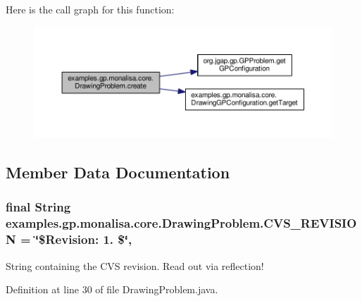 Here is the call graph for this function\-:
\nopagebreak
\begin{figure}[H]
\begin{center}
\leavevmode
\includegraphics[width=350pt]{classexamples_1_1gp_1_1monalisa_1_1core_1_1_drawing_problem_a5c391c027376cc876de2672312b7cfa0_cgraph}
\end{center}
\end{figure}




\subsection{Member Data Documentation}
\hypertarget{classexamples_1_1gp_1_1monalisa_1_1core_1_1_drawing_problem_a99ad1787f05be2ea069f05b7a4353b07}{
\subsubsection[{C\-V\-S\-\_\-\-R\-E\-V\-I\-S\-I\-O\-N}]{\setlength{\rightskip}{0pt plus 5cm}final String examples.\-gp.\-monalisa.\-core.\-Drawing\-Problem.\-C\-V\-S\-\_\-\-R\-E\-V\-I\-S\-I\-O\-N = \char`\"{}\$Revision\-: 1. \$\char`\"{}\hspace{0.3cm}{\ttfamily [static]}, {\ttfamily [private]}}}\label{classexamples_1_1gp_1_1monalisa_1_1core_1_1_drawing_problem_a99ad1787f05be2ea069f05b7a4353b07}
String containing the C\-V\-S revision. Read out via reflection! 

Definition at line 30 of file Drawing\-Problem.\-java.

